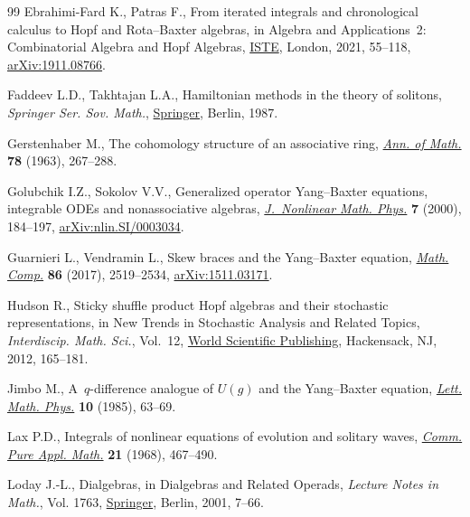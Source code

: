 \documentclass[10pt,a4paper]{amsart}
\numberwithin{equation}{section}
\newcounter{diff_order}
\newcounter{diff_power}
\theoremstyle{definition}
\def\mathfrak#1{#1}%
\begin{document}
\begin{thebibliography}{99}
Ebrahimi-Fard K., Patras F., From iterated integrals and chronological calculus
 to {H}opf and {R}ota--{B}axter algebras, in Algebra and Applications~2:
 Combinatorial Algebra and {H}opf Algebras,
 \href{https://doi.org/10.1002/9781119880912.ch2}{ISTE}, London, 2021,
 55--118, \href{http://arxiv.org/abs/1911.08766}{arXiv:1911.08766}.

Faddeev L.D., Takhtajan L.A., Hamiltonian methods in the theory of solitons,
 \textit{Springer Ser. Sov. Math.},
 \href{https://doi.org/10.1007/978-3-540-69969-9}{Springer}, Berlin, 1987.

Gerstenhaber M., The cohomology structure of an associative ring,
 \href{https://doi.org/10.2307/1970343}{\textit{Ann. of Math.}} \textbf{78}
 (1963), 267--288.

Golubchik I.Z., Sokolov V.V., Generalized operator {Y}ang--{B}axter equations,
 integrable {ODE}s and nonassociative algebras,
 \href{https://doi.org/10.2991/jnmp.2000.7.2.8}{\textit{J.~Nonlinear Math.
 Phys.}} \textbf{7} (2000), 184--197,
 \href{http://arxiv.org/abs/nlin.SI/0003034}{arXiv:nlin.SI/0003034}.

Guarnieri L., Vendramin L., Skew braces and the {Y}ang--{B}axter equation,
 \href{https://doi.org/10.1090/mcom/3161}{\textit{Math. Comp.}} \textbf{86}
 (2017), 2519--2534, \href{http://arxiv.org/abs/1511.03171}{arXiv:1511.03171}.

Hudson R., Sticky shuffle product {H}opf algebras and their stochastic
 representations, in New Trends in Stochastic Analysis and Related Topics,
 \textit{Interdiscip. Math. Sci.}, Vol.~12,
 \href{https://doi.org/10.1142/9789814360920_0006}{World Scientific
 Publishing}, Hackensack, NJ, 2012, 165--181.

Jimbo M., A~{$q$}-difference analogue of {$U({\mathfrak g})$} and the
 {Y}ang--{B}axter equation,
 \href{https://doi.org/10.1007/BF00704588}{\textit{Lett. Math. Phys.}}
 \textbf{10} (1985), 63--69.

Lax P.D., Integrals of nonlinear equations of evolution and solitary waves,
 \href{https://doi.org/10.1002/cpa.3160210503}{\textit{Comm. Pure Appl.
 Math.}} \textbf{21} (1968), 467--490.

Loday J.-L., Dialgebras, in Dialgebras and Related Operads, \textit{Lecture
 Notes in Math.}, Vol. 1763,
 \href{https://doi.org/10.1007/3-540-45328-8_2}{Springer}, Berlin, 2001,
 7--66.


\end{thebibliography}
\end{document}
